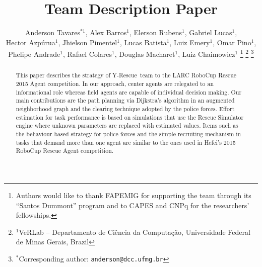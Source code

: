 \documentclass[a4paper, 10pt, conference]{ieeeconf}      %
\title{\teamname Team Description Paper}
\author{
	Anderson Tavares$^{*1}$, Alex Barros$^{1}$, Elerson Rubens$^{1}$, Gabriel Lucas$^{1}$, \\ Hector Azpúrua$^{1}$, 
		Jhielson Pimentel$^{1}$, Lucas Batista$^{1}$, Luiz Emery$^{1}$, Omar Pino$^{1}$, \\
		Phelipe Andrade$^{1}$, Rafael Colares$^{1}$, Douglas Macharet$^{1}$, Luiz Chaimowicz$^{1}$ 
		\thanks{Authors would like to thank FAPEMIG for supporting the team through its ``Santos Dummont'' program and to CAPES and CNPq for the researchers' fellowships.}
		\thanks{$^{1}$VeRLab -- Departamento de Ciência da Computação, Universidade Federal de Minas Gerais, Brazil}
		\thanks{$^{*}$Corresponding author: {\tt\small anderson@dcc.ufmg.br}}
}
\newcommand{\teamname}{Y-Rescue~}
\begin{document}
\maketitle

\begin{abstract}
This paper describes the strategy of \teamname team to the LARC RoboCup Rescue 2015 Agent competition. %
In our approach, center agents are relegated to an informational role whereas field agents are capable of individual decision making. Our main contributions are the path planning via Dijkstra's algorithm in an augmented neighborhood graph and the clearing technique adopted by the police forces. %
Effort estimation for task performance is based on simulations that use the Rescue Simulator engine where unknown parameters are replaced with estimated values. Items such as the behaviour-based strategy for police forces and the simple recruiting mechanism in tasks that demand more than one agent are similar to the ones used in Hefei's 2015 RoboCup Rescue Agent competition.
\end{abstract}




















%






%

\end{document}
